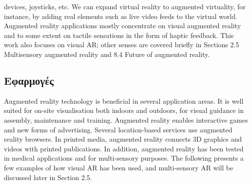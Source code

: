 devices, joysticks, etc. We can expand virtual reality to augmented virtuality, for instance, by adding real elements such as live video feeds to the virtual world. Augmented reality applications mostly concentrate on visual augmented reality and to some extent on tactile sensations in the form of haptic feedback. This work also focuses on visual AR; other senses are covered briefly in Sections 2.5 Multisensory augmented reality and 8.4 Future of augmented reality.



\subsection{Εφαρμογές}

Augmented reality technology is beneficial in several application areas. It is well
suited for on-site visualisation both indoors and outdoors, for visual guidance in
assembly, maintenance and training. Augmented reality enables interactive games
and new forms of advertising. Several location-based services use augmented
reality browsers. In printed media, augmented reality connects 3D graphics and
videos with printed publications. In addition, augmented reality has been tested in
medical applications and for multi-sensory purposes. The following presents a few
examples of how visual AR has been used, and multi-sensory AR will be discussed
later in Section 2.5.

